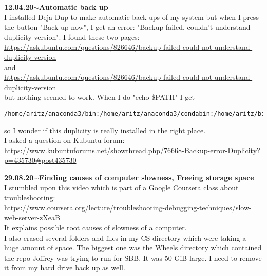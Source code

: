 \documentclass[11pt,a4paper]{article}
\newenvironment{loggentry}[2]%
{\noindent\textbf{#1}\hspace{1cm}$\mathbf{\sim}$\text{ }\textbf{#2}\\}{\vspace{0.5cm}}
\begin{document}
\begin{loggentry}{12.04.20}{Automatic back up}

I installed Deja Dup to make automatic back ups of my system but when I press the button "Back up now", I get an error: "Backup failed, couldn't understand duplicity version". I found these two pages:\\
\url{https://askubuntu.com/questions/826646/backup-failed-could-not-understand-duplicity-version}\\
and\\
\url{https://askubuntu.com/questions/826646/backup-failed-could-not-understand-duplicity-version}\\
but nothing seemed to work. When I do "echo \$PATH" I get
\begin{verbatim}
/home/aritz/anaconda3/bin:/home/aritz/anaconda3/condabin:/home/aritz/bin:/home/aritz/.local/bin:/usr/local/sbin:/usr/local/bin:/usr/sbin:/usr/bin:/sbin:/bin:/usr/games:/usr/local/games:/snap/bin
\end{verbatim}
so I wonder if this duplicity is really installed in the right place.\\

I asked a question on Kubuntu forum:\\
\url{https://www.kubuntuforums.net/showthread.php/76668-Backup-error-Duplicity?p=435730#post435730}\\

\end{loggentry}



\begin{loggentry}{29.08.20}{Finding causes of computer slowness, Freeing storage space}

I stumbled upon this video which is part of a Google Coursera class about troubleshooting:\\
\url{https://www.coursera.org/lecture/troubleshooting-debugging-techniques/slow-web-server-zXeaB}\\
It explains possible root causes of slowness of a computer.\\

I also erased several folders and files in my CS directory which were taking a huge amount of space. The biggest one was the Wheels directory which contained the repo Joffrey was trying to run for SBB. It was 50 GiB large. I need to remove it from my hard drive back up as well.\\

\end{loggentry}
\end{document}
